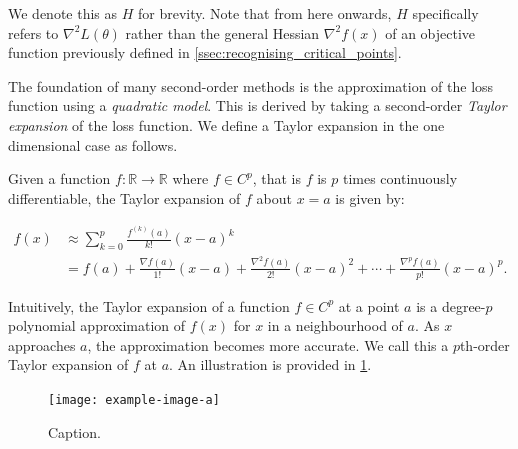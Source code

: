 We denote this as $H$ for brevity. Note that from here onwards, $H$ specifically refers to $\nabla^2 L(\theta)$ rather than the general Hessian $\nabla^2 f(x)$ of an objective function previously defined in \cref{ssec:recognising_critical_points}.



The foundation of many second-order methods is the approximation of the loss function using a \textit{quadratic model}. This is derived by taking a second-order \textit{Taylor expansion} of the loss function. We define a Taylor expansion in the one dimensional case as follows.

\begin{definition}

    Given a function $f: \mathbb{R} \to \mathbb{R}$ where $f \in C^p$, that is $f$ is $p$ times continuously differentiable, the Taylor expansion of $f$ about $x = a$ is given by:

    \begin{align}

        f(x) 

        &\approx \sum_{k=0}^{p} \frac{f^{(k)}(a)}{k!} (x-a)^k \\

        &= f(a) + \frac{\nabla f(a)}{1!} (x-a) + \frac{\nabla^2 f(a)}{2!} (x-a)^2 + \cdots + \frac{\nabla^p f(a)}{p!} (x-a)^p.

    \end{align}

\end{definition}

Intuitively, the Taylor expansion of a function $f \in C^p$ at a point $a$ is a degree-$p$ polynomial approximation of $f(x)$ for $x$ in a neighbourhood of $a$. As $x$ approaches $a$, the approximation becomes more accurate. We call this a $p$th-order Taylor expansion of $f$ at $a$. An illustration is provided in \cref{fig:taylor_expansion}.




\begin{figure}[h]

    \centering

    \texttt{[image: example-image-a]}

    \caption{Caption.}

    \label{fig:taylor_expansion}

\end{figure}



